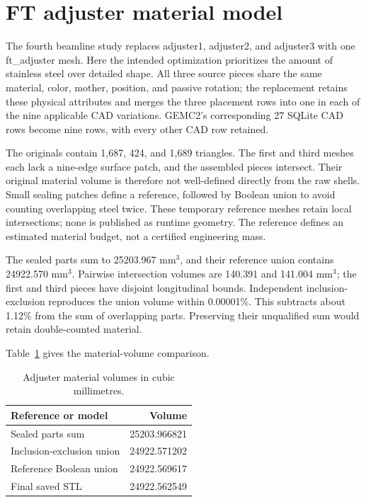 \FloatBarrier
\section{FT adjuster material model}

The fourth beamline study replaces adjuster1, adjuster2, and adjuster3 with one ft\_adjuster mesh. Here the
intended optimization prioritizes the amount of stainless steel over detailed shape. All three source pieces
share the same material, color, mother, position, and passive rotation; the replacement retains these
physical attributes and merges the three placement rows into one in each of the nine applicable CAD
variations. GEMC2's corresponding 27 SQLite CAD rows become nine rows, with every other CAD row retained.

The originals contain 1,687, 424, and 1,689 triangles. The first and third meshes each lack a nine-edge
surface patch, and the assembled pieces intersect. Their original material volume is therefore not
well-defined directly from the raw shells. Small sealing patches define a reference, followed by Boolean
union to avoid counting overlapping steel twice. These temporary reference meshes retain local
intersections; none is published as runtime geometry. The reference defines an estimated material budget,
not a certified engineering mass.

The sealed parts sum to 25203.967 mm$^3$, and their reference union contains 24922.570 mm$^3$. Pairwise
intersection volumes are 140.391 and 141.004 mm$^3$; the first and third pieces have disjoint longitudinal
bounds. Independent inclusion-exclusion reproduces the union volume within 0.00001\%. This subtracts about
1.12\% from the sum of overlapping parts. Preserving their unqualified sum would retain double-counted
material.

Table~\ref{tab:adjuster-material} gives the material-volume comparison.

\begin{table}[htbp]
\centering
\caption{Adjuster material volumes in cubic millimetres.}
\label{tab:adjuster-material}
\begin{tabular}{lr}
\toprule
Reference or model & Volume \\
\midrule
Sealed parts sum & 25203.966821 \\
Inclusion-exclusion union & 24922.571202 \\
Reference Boolean union & 24922.569617 \\
Final saved STL & 24922.562549 \\
\bottomrule
\end{tabular}
\end{table}

